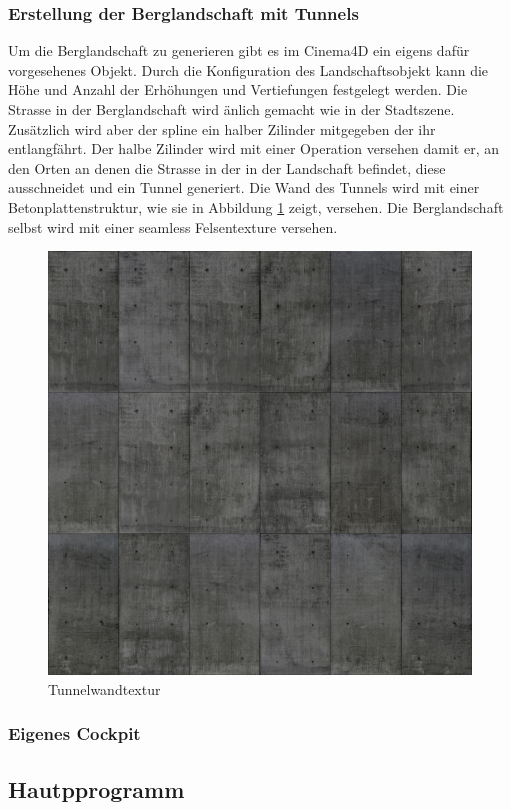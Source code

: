 \subsubsection{Erstellung der Berglandschaft mit Tunnels}
Um die Berglandschaft zu generieren gibt es im Cinema4D ein eigens dafür vorgesehenes Objekt. Durch die Konfiguration des Landschaftsobjekt kann die Höhe und Anzahl der Erhöhungen und Vertiefungen festgelegt werden. Die Strasse in der Berglandschaft wird änlich gemacht wie in der Stadtszene. Zusätzlich wird aber der \gls{spline} ein halber Zilinder mitgegeben der ihr entlangfährt. Der halbe Zilinder wird mit einer Operation versehen damit er, an den Orten an denen die Strasse in der in der Landschaft befindet, diese ausschneidet und ein Tunnel generiert. Die Wand des Tunnels wird mit einer Betonplattenstruktur, wie sie in Abbildung \ref{texture_concretetiles} zeigt, versehen. Die Berglandschaft selbst wird mit einer \gls{seamless} Felsentexture versehen. 
\begin{figure}[htbp]
\centering 
\includegraphics[scale=0.6]{src/texture_concretetiles.png}
\caption{Tunnelwandtextur} %
\label{texture_concretetiles} %
\end{figure}

\subsubsection{Eigenes Cockpit}




\subsection{Hautpprogramm}



